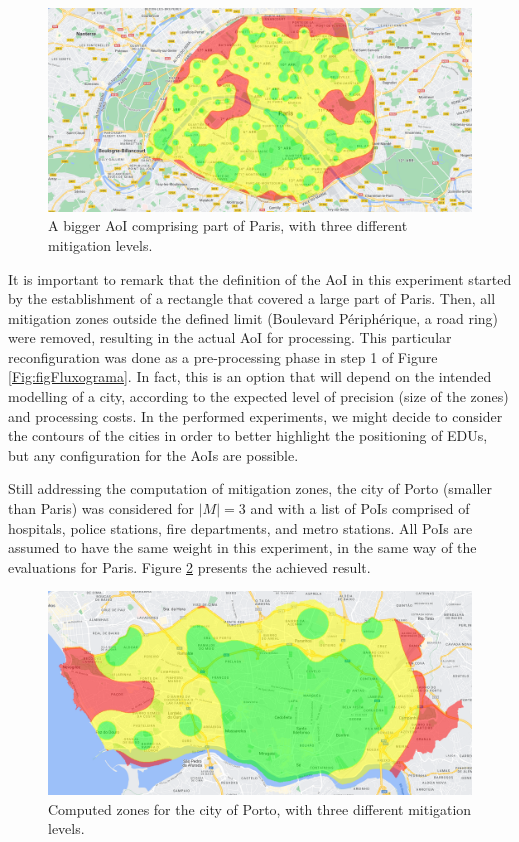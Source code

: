 \begin{refsection}
\begin{figure}[ht!]
    \centering
    \includegraphics[width=0.9\linewidth]{Chapters/2-EDUs/images/paris_M3.png}
    \caption{A bigger AoI comprising part of Paris, with three different mitigation levels.}
    \label{Fig:zones_paris_3}
\end{figure}

It is important to remark that the definition of the AoI in this experiment started by the establishment of a rectangle that covered a large part of Paris. Then, all mitigation zones outside the defined limit (Boulevard Périphérique, a road ring) were removed, resulting in the actual AoI for processing. This particular reconfiguration was done as a pre-processing phase in step 1 of Figure \ref{Fig:figFluxograma}. In fact, this is an option that will depend on the intended modelling of a city, according to the expected level of precision (size of the zones) and processing costs. In the performed experiments, we might decide to consider the contours of the cities in order to better highlight the positioning of EDUs, but any configuration for the AoIs are possible.

Still addressing the computation of mitigation zones, the city of Porto (smaller than Paris) was considered for $|M|=3$ and with a list of PoIs comprised of hospitals, police stations, fire departments, and metro stations. All PoIs are assumed to have the same weight in this experiment, in the same way of the evaluations for Paris. Figure \ref{Fig:zones_porto_3} presents the achieved result. 

\begin{figure}[ht!]
    \centering
    \includegraphics[width=0.9\linewidth]{Chapters/2-EDUs/images/porto_M3_no_weight.png}
    \caption{Computed zones for the city of Porto, with three different mitigation levels.}
    \label{Fig:zones_porto_3}
\end{figure}


\end{refsection}
